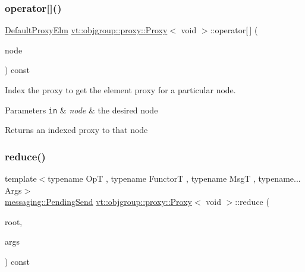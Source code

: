 \subsubsection{\texorpdfstring{operator[]()}{operator[]()}}
{\footnotesize\ttfamily \hyperlink{namespacevt_1_1objgroup_1_1proxy_ae207233400f23aa10c30217cdb369c54}{Default\+Proxy\+Elm} \hyperlink{structvt_1_1objgroup_1_1proxy_1_1_proxy}{vt\+::objgroup\+::proxy\+::\+Proxy}$<$ void $>$\+::operator\mbox{[}$\,$\mbox{]} (\begin{DoxyParamCaption}\item[{\hyperlink{namespacevt_a866da9d0efc19c0a1ce79e9e492f47e2}{Node\+Type}}]{node }\end{DoxyParamCaption}) const\hspace{0.3cm}{\ttfamily [inline]}}



Index the proxy to get the element proxy for a particular node. 


\begin{DoxyParams}[1]{Parameters}
\mbox{\tt in}  & {\em node} & the desired node\\
\hline
\end{DoxyParams}
\begin{DoxyReturn}{Returns}
an indexed proxy to that node 
\end{DoxyReturn}
\mbox{\label{structvt_1_1objgroup_1_1proxy_1_1_proxy_3_01void_01_4_a8e3989588197eb5dc128302c93e74468}} 
\subsubsection{\texorpdfstring{reduce()}{reduce()}\hspace{0.1cm}{\footnotesize\ttfamily [1/2]}}
{\footnotesize\ttfamily template$<$typename OpT , typename FunctorT , typename MsgT , typename... Args$>$ \\
\hyperlink{structvt_1_1messaging_1_1_pending_send}{messaging\+::\+Pending\+Send} \hyperlink{structvt_1_1objgroup_1_1proxy_1_1_proxy}{vt\+::objgroup\+::proxy\+::\+Proxy}$<$ void $>$\+::reduce (\begin{DoxyParamCaption}\item[{\hyperlink{namespacevt_a866da9d0efc19c0a1ce79e9e492f47e2}{Node\+Type}}]{root,  }\item[{Args \&\&...}]{args }\end{DoxyParamCaption}) const}




